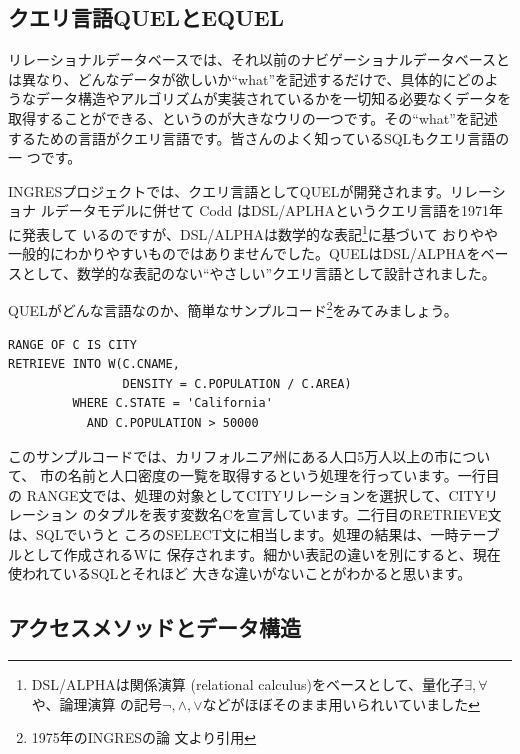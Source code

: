 \subsection{クエリ言語QUELとEQUEL}

リレーショナルデータベースでは、それ以前のナビゲーショナルデータベースと
は異なり、どんなデータが欲しいか``what''を記述するだけで、具体的にどのよ
うなデータ構造やアルゴリズムが実装されているかを一切知る必要なくデータを
取得することができる、というのが大きなウリの一つです。その``what''を記述
するための言語がクエリ言語です。皆さんのよく知っているSQLもクエリ言語の一
つです。

INGRESプロジェクトでは、クエリ言語としてQUELが開発されます。リレーショナ
ルデータモデルに併せて Codd はDSL/APLHAというクエリ言語を1971年に発表して
いるのですが、DSL/ALPHAは数学的な表記\footnote{DSL/ALPHAは関係演算
(relational calculus)をベースとして、量化子$\exists, \forall$や、論理演算
の記号$\lnot,\land,\lor$などがほぼそのまま用いられいていました}に基づいて
おりやや一般的にわかりやすいものではありませんでした。QUELはDSL/ALPHAをベー
スとして、数学的な表記のない``やさしい''クエリ言語として設計されました。

QUELがどんな言語なのか、簡単なサンプルコード\footnote{1975年のINGRESの論
文より引用}をみてみましょう。

\begin{center}
 \begin{minipage}{0.9\textwidth}
  \begin{verbatim}
RANGE OF C IS CITY
RETRIEVE INTO W(C.CNAME,
                DENSITY = C.POPULATION / C.AREA)
         WHERE C.STATE = 'California'
           AND C.POPULATION > 50000
  \end{verbatim}
 \end{minipage}
\end{center}

このサンプルコードでは、カリフォルニア州にある人口5万人以上の市について、
市の名前と人口密度の一覧を取得するという処理を行っています。一行目の
RANGE文では、処理の対象としてCITYリレーションを選択して、CITYリレーション
のタプルを表す変数名Cを宣言しています。二行目のRETRIEVE文は、SQLでいうと
ころのSELECT文に相当します。処理の結果は、一時テーブルとして作成されるWに
保存されます。細かい表記の違いを別にすると、現在使われているSQLとそれほど
大きな違いがないことがわかると思います。

\subsection{アクセスメソッドとデータ構造}

